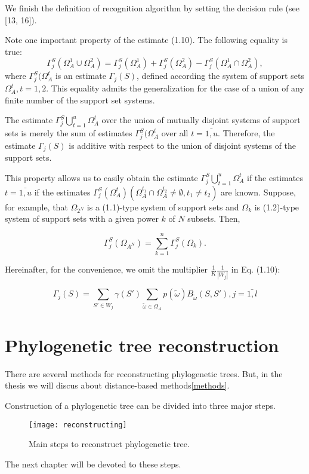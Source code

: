We finish the definition of recognition algorithm by setting the decision rule (see [13, 16]).

Note one important property of the estimate (1.10). The following equality is true:
\begin{equation*}
\Gamma_j^S(\Omega_A^1 \cup \Omega_A^2) = \Gamma_j^S(\Omega_A^1) + \Gamma_j^S(\Omega_A^2) - \Gamma_j^S(\Omega_A^1 \cap \Omega_A^2), 
\end{equation*}
where $\Gamma_j^S(\Omega_A^t$ is an estimate $\Gamma_j(S)$, defined according the 
system of support sets $\Omega_A^t, t = 1,2$.
This equality admits the generalization for the case of a union of any finite 
number of the support set systems.

The estimate $\Gamma_j^S \bigcup \limits_{t=1}^u \Omega_A^t$
over the union of mutually disjoint systems of support sets is merely the sum of estimates
$\Gamma_j^S(\Omega_A^t$ over all $t = \bar{1,u}$. Therefore, the estimate 
$\Gamma_j(S)$ is additive with respect to 
the union of disjoint systems of the support sets. 

This property allows us to easily obtain the estimate
$\Gamma_j^S \bigcup \limits_{t=1}^u \Omega_A^t$ if the estimates $t = \bar{1,u}$
if the estimates 
$\Gamma_j^S (\Omega_A^t) (\Omega_A^{t_1} \cap  \Omega_A^{t_2} \neq \emptyset, t_1 \neq t_2)$
are known. Suppose, for example, that
$\Omega_{2^N}$ is a (1.1)-type system of support sets and
$\Omega_k$  is (1.2)-type system of support sets with a given power $k$ of $N$ subsets. Then,

\begin{equation*}
\Gamma_j^S(\Omega_{A^N}) = \sum_{k=1}^n \Gamma_j^S(\Omega_k). 
\end{equation*}

Hereinafter, for the convenience, we omit the multiplier 
$\frac{1}{K}\frac{1}{|W_j|}$ in Eq. (1.10):

\begin{equation}
\Gamma_j(S) = \sum_{S' \in W_j} \gamma(S') \sum_{\tilde{\omega} \in \Omega_A} p(\tilde{\omega}) B_{\tilde{\omega}}(S,S'), j = \bar{1,l}
\end{equation}

\section{Phylogenetic tree reconstruction}
There are several methods for reconstructing phylogenetic trees.
But, in the thesis we will discus about distance-based methods\ref{methods}.

Construction of a phylogenetic tree can be divided 
into three major steps.

\begin{figure}[!htb] 
  \center
  \texttt{[image: reconstructing]}
  \caption[w]{Main steps to reconstruct phylogenetic tree.} 
  \label{img:rec1}  
\end{figure}

The next chapter will be devoted to these steps.



\newpage